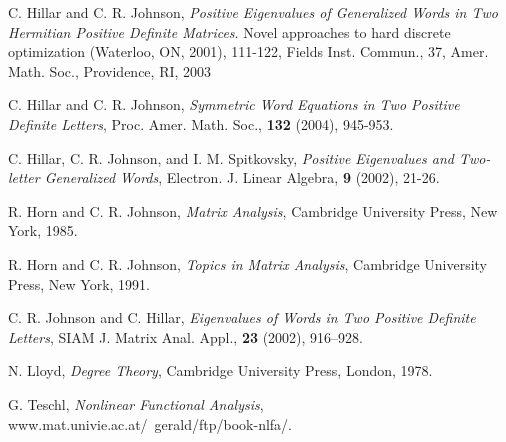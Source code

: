 \documentclass{amsart}
\theoremstyle{definition}
\theoremstyle{remark}
\numberwithin{equation}{section}
\newcommand{\<}{\langle}
\renewcommand{\>}{\rangle}
\begin{document}
\begin{thebibliography}{1}

C. Hillar and C. R. Johnson, \textit{Positive Eigenvalues of Generalized Words in Two Hermitian Positive Definite Matrices}. Novel approaches to hard discrete optimization (Waterloo, ON, 2001), 111-122, Fields Inst. Commun., 37, Amer. Math. Soc., Providence, RI, 2003

C. Hillar and C. R. Johnson, \emph{Symmetric Word Equations in Two
Positive Definite Letters}, Proc. Amer. Math. Soc., \textbf{132}
(2004), 945-953.

C. Hillar, C. R. Johnson, and I. M. Spitkovsky, \textit{Positive  Eigenvalues and Two-letter Generalized Words}, Electron. J. Linear Algebra,  \textbf{9} (2002), 21-26. 

R. Horn and C. R. Johnson, \emph{Matrix Analysis}, Cambridge
University Press, New York, 1985.

R. Horn and C. R. Johnson, \emph{Topics in Matrix Analysis},
Cambridge University Press, New York, 1991.

C. R. Johnson and C. Hillar, \emph{Eigenvalues of Words in Two
Positive Definite Letters}, SIAM J. Matrix Anal. Appl.,
\textbf{23} (2002), 916--928.

N. Lloyd, \emph{Degree Theory}, Cambridge University Press, London, 1978.

G. Teschl, \emph{Nonlinear Functional Analysis}, www.mat.univie.ac.at/~gerald/ftp/book-nlfa/.

\end{thebibliography}
\end{document}
